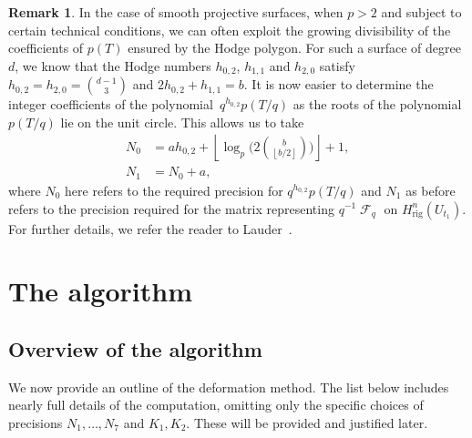 \documentclass[a4paper,11pt]{article}
\numberwithin{equation}{section}
\providecommand{\floor}[1]{\left\lfloor#1\right\rfloor}   %
\DeclareMathOperator{\Frob}{\mathcal{F}} %
\providecommand{\Hrig}{H_{\text{rig}}}  %
\theoremstyle{definition}
\newtheorem{rem}[thm]{Remark}
\begin{document}
\begin{rem} \label{rem:N0Surfaces}
In the case of smooth projective surfaces, when $p > 2$ and subject to 
certain technical conditions, we can often exploit the growing divisibility 
of the coefficients of $p(T)$ ensured by the Hodge polygon.  For such a surface 
of degree~$d$, we know that the Hodge numbers $h_{0,2}$, $h_{1,1}$ and $h_{2,0}$ 
satisfy $h_{0,2} = h_{2,0} = \binom{d-1}{3}$ and $2 h_{0,2} + h_{1,1} = b$. 
It is now easier to determine the integer coefficients of the 
polynomial~$q^{h_{0,2}} p(T/q)$ as the roots of the polynomial $p(T/q)$ lie 
on the unit circle.  This allows us to take 
\begin{align*}
N_0 & = a h_{0,2} + \floor{\log_p \biggl( 2 \binom{b}{\floor{b/2}}\biggr)} + 1,\\
N_1 & = N_0 + a,
\end{align*}
where $N_0$ here refers to the required precision for $q^{h_{0,2}} p(T/q)$ 
and $N_1$ as before refers to the precision required for the matrix 
representing $q^{-1} \Frob_q$ on $\Hrig^{n}(U_{t_1})$.
For further details, we refer the reader to 
Lauder~\citep[\S 9.3.2, Proposition~9.6]{Lauder2006}.
\end{rem}


\section{The algorithm}
\label{sec:Algorithm}

\subsection{Overview of the algorithm}

We now provide an outline of the deformation method.  The list below 
includes nearly full details of the computation, omitting only the 
specific choices of precisions $N_1, \dotsc, N_7$
and $K_1, K_2$. These will be provided and justified later.
\end{document}
